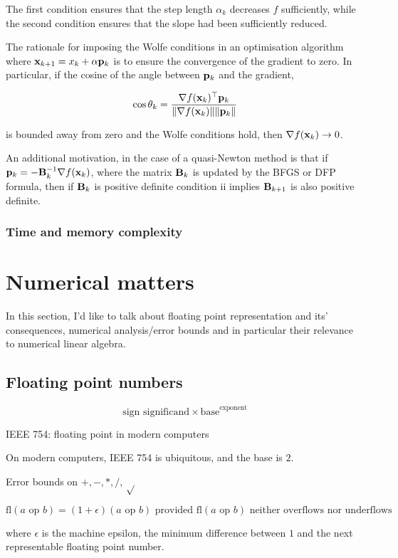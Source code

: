 \documentclass{article}[12pt]
\begin{document}
The first condition ensures that the step length $\alpha_k$ decreases $f$ sufficiently, while the second condition
ensures that the slope had been sufficiently reduced.

The rationale for imposing the Wolfe conditions in an optimisation algorithm where
${\bf x}_{k+1} = x_k + \alpha {\bf p}_k$ is to ensure the convergence of the gradient to zero. In particular, if the
cosine of the angle between ${\bf p}_k$ and the gradient,

$$
\cos \theta_k = \frac{\nabla f({\bf x}_k)^\top {\bf p}_k}{\|\nabla f({\bf x}_k)\| \|{\bf p}_k\|}
$$

is bounded away from zero and the Wolfe conditions hold, then $\nabla f({\bf x}_k) \to 0$.

An additional motivation, in the case of a quasi-Newton method is that if ${\bf p}_k = - {\bf B}_k^{-1} \nabla f({\bf x}_k)$,
where the matrix ${\bf B}_k$ is updated by the BFGS or DFP formula, then if ${\bf B}_k$ is positive definite condition ii
implies ${\bf B}_{k+1}$ is also positive definite.

\subsubsection{Time and memory complexity}

\section{Numerical matters}

In this section, I'd like to talk about floating point representation and its' consequences, numerical
analysis/error bounds and in particular their relevance to numerical linear algebra.

\subsection{Floating point numbers}

$$\text{sign } \text{significand} \times \text{base}^\text{exponent}$$

IEEE 754: floating point in modern computers

On modern computers, IEEE 754 is ubiquitous, and the base is $2$.

Error bounds on $+, -, *, /, \sqrt$

$$
\text{fl}(a \text{ op } b) = (1 + \epsilon) (a \text{ op } b) \text{ provided $\text{fl}(a \text{ op } b)$ neither overflows nor underflows}
$$

where $\epsilon$ is the machine epsilon, the minimum difference between $1$ and the next representable
floating point number.
\end{document}
